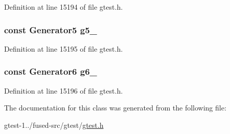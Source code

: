 \-Definition at line 15194 of file gtest.\-h.

\hypertarget{classtesting_1_1internal_1_1CartesianProductHolder6_ac153ca256cc6aabca132e9276e0b7e80}{
\subsubsection[{g5\-\_\-}]{\setlength{\rightskip}{0pt plus 5cm}const \-Generator5 {\bf g5\-\_\-}}}\label{da/dd4/classtesting_1_1internal_1_1CartesianProductHolder6_ac153ca256cc6aabca132e9276e0b7e80}


\-Definition at line 15195 of file gtest.\-h.

\hypertarget{classtesting_1_1internal_1_1CartesianProductHolder6_ac5367ac6ea4b99933483d6181bace5c2}{
\subsubsection[{g6\-\_\-}]{\setlength{\rightskip}{0pt plus 5cm}const \-Generator6 {\bf g6\-\_\-}}}\label{da/dd4/classtesting_1_1internal_1_1CartesianProductHolder6_ac5367ac6ea4b99933483d6181bace5c2}


\-Definition at line 15196 of file gtest.\-h.



\-The documentation for this class was generated from the following file\-:\begin{DoxyCompactItemize}
\item 
gtest-\/1../fused-\/src/gtest/\hyperlink{fused-src_2gtest_2gtest_8h}{gtest.\-h}\end{DoxyCompactItemize}
